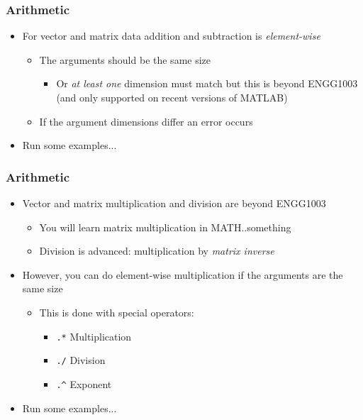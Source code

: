\documentclass[14pt]{beamer}
\begin{document}
\begin{frame}
\frametitle{Arithmetic}
\begin{itemize}
\item For vector and matrix data addition and subtraction is \textit{element-wise}
	\begin{itemize}
		\item The arguments should be the same size
			\begin{itemize}
				\item Or \textit{at least one} dimension must match but this is beyond ENGG1003 (and only supported on recent versions of MATLAB)
			\end{itemize}
		\item If the argument dimensions differ an error occurs
	\end{itemize}
\item Run some examples...
\end{itemize}
\end{frame}

\begin{frame}
\frametitle{Arithmetic}
\begin{itemize}
\item Vector and matrix multiplication and division are beyond ENGG1003
	\begin{itemize}
		\item You will learn matrix multiplication in MATH..something
		\item Division is advanced: multiplication by \textit{matrix inverse}
	\end{itemize}
\pause
\item However, you can do element-wise multiplication if the arguments are the same size
	\begin{itemize}
		\item This is done with special operators:
			\begin{itemize}
				\item \texttt{.*} Multiplication
				\item \texttt{./} Division
				\item \texttt{.\^} Exponent 
			\end{itemize}
	\end{itemize}
\item Run some examples...
\end{itemize}
\end{frame}
\end{document}
